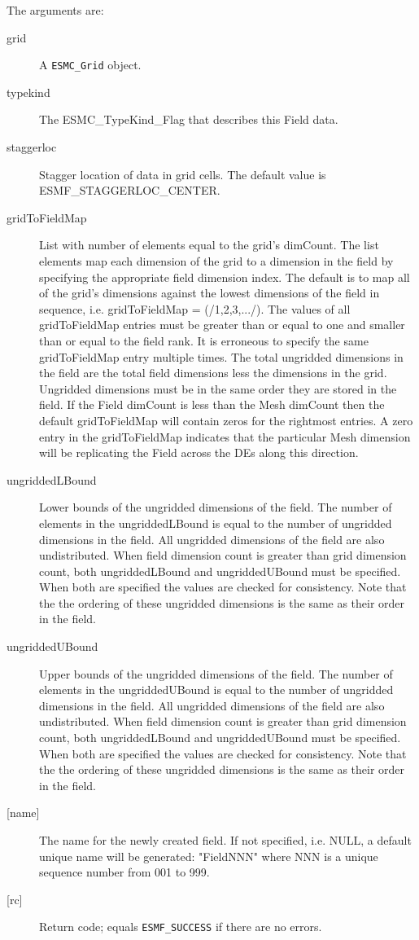     The arguments are:
    \begin{description}
    \item[grid]
      A {\tt ESMC\_Grid} object.
    \item[typekind]
      The ESMC\_TypeKind\_Flag that describes this Field data.
    \item[staggerloc]
      Stagger location of data in grid cells. The default value is 
      ESMF\_STAGGERLOC\_CENTER.
    \item[gridToFieldMap]
      List with number of elements equal to the grid's dimCount. The list
      elements map each dimension of the grid to a dimension in the field by
      specifying the appropriate field dimension index. The default is to map all of
      the grid's dimensions against the lowest dimensions of the field in sequence,
      i.e. gridToFieldMap = (/1,2,3,.../). The values of all gridToFieldMap entries
      must be greater than or equal to one and smaller than or equal to the field
      rank. It is erroneous to specify the same gridToFieldMap entry multiple times.
      The total ungridded dimensions in the field  are the total field dimensions
      less the dimensions in the grid. Ungridded dimensions must be in the same order
      they are stored in the field. If the Field dimCount is less than the Mesh
      dimCount then the default gridToFieldMap will contain zeros for the rightmost
      entries. A zero entry in the gridToFieldMap indicates that the particular Mesh
      dimension will be replicating the Field across the DEs along this direction.
    \item[ungriddedLBound]
      Lower bounds of the ungridded dimensions of the field. The number of elements
      in the ungriddedLBound is equal to the number of ungridded dimensions in the
      field. All ungridded dimensions of the field are also undistributed. When field
      dimension count is greater than grid dimension count, both ungriddedLBound and
      ungriddedUBound must be specified. When both are specified the values are
      checked for consistency. Note that the the ordering of these ungridded
      dimensions is the same as their order in the field.  
    \item[ungriddedUBound]
      Upper bounds of the ungridded dimensions of the field. The number of elements
      in the ungriddedUBound is equal to the number of ungridded dimensions in the
      field. All ungridded dimensions of the field are also undistributed. When field
      dimension count is greater than grid dimension count, both ungriddedLBound and
      ungriddedUBound must be specified. When both are specified the values are
      checked for consistency. Note that the the ordering of these ungridded
      dimensions is the same as their order in the field.  
    \item[{[name]}]
      The name for the newly created field.  If not specified, i.e. NULL,
      a default unique name will be generated: "FieldNNN" where NNN
      is a unique sequence number from 001 to 999.
    \item[{[rc]}]
      Return code; equals {\tt ESMF\_SUCCESS} if there are no errors.
    \end{description}
   
